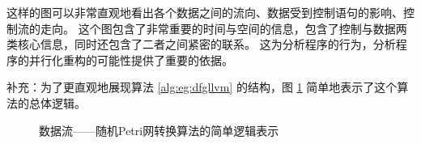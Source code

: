 这样的图可以非常直观地看出各个数据之间的流向、数据受到控制语句的影响、控制流的走向。
这个图包含了非常重要的时间与空间的信息，包含了控制与数据两类核心信息，同时还包含了二者之间紧密的联系。
这为分析程序的行为，分析程序的并行化重构的可能性提供了重要的依据。

补充：为了更直观地展现算法 \ref{alg:eg:dfgllvm} 的结构，图 \ref{fig:eg:dfgalgo} 简单地表示了这个算法的总体逻辑。

\newsavebox{\egdfgalgo}
\begin{figure}[!hbt]
\centering
\usebox{\egdfgalgo}
\caption{数据流——随机Petri网转换算法的简单逻辑表示} \label{fig:eg:dfgalgo}
\end{figure}
